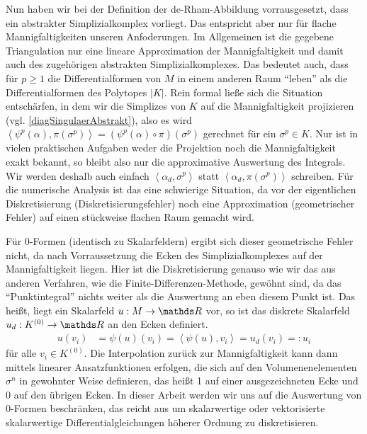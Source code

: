   \begin{bemerkung}
    Nun haben wir bei der Definition der de-Rham-Abbildung vorrausgesetzt, dass ein abstrakter Simplizialkomplex vorliegt.
    Das entspricht aber nur für flache Mannigfaltigkeiten unseren Anfoderungen.
    Im Allgemeinen ist die gegebene Triangulation nur eine lineare Approximation der Mannigfaltigkeit und damit auch des zugehörigen abstrakten Simplizialkomplexes.
    Das bedeutet auch, dass für \( p \ge 1 \) die Differentialformen von \( M \) in einem anderen Raum "`leben"' als die Differentialformen des Polytopes \( |K| \).
    Rein formal ließe sich die Situation entschärfen, in dem wir die Simplizes von \( K \) auf die Mannigfaltigkeit projizieren (vgl. \eqref{diagSingulaerAbstrakt}), also es wird
    \( \left\langle \psi^{p}(\alpha), \pi(\sigma^{p}) \right\rangle = \left( \psi^{p}(\alpha) \circ \pi \right)(\sigma^{p}) \) gerechnet für ein \( \sigma^{p}\in K \).
    Nur ist in vielen praktischen Aufgaben weder die Projektion noch die Mannigfaltigkeit exakt bekannt, so bleibt also nur die approximative Auswertung des Integrals.
    Wir werden deshalb auch einfach  \( \left\langle \alpha_{d}, \sigma^{p} \right\rangle \) statt \( \left\langle \alpha_{d}, \pi(\sigma^{p}) \right\rangle \) schreiben.
    Für die numerische Analysis ist das eine schwierige Situation, da vor der eigentlichen Diskretisierung (Diskretisierungsfehler) noch eine Approximation (geometrischer Fehler) auf einen stückweise
    flachen Raum gemacht wird.

    Für \( 0 \)-Formen (identisch zu Skalarfeldern) ergibt sich dieser geometrische Fehler nicht, da nach Vorraussetzung die Ecken des Simplizialkomplexes auf der Mannigfaltigkeit liegen.
    Hier ist die Diskretisierung genauso wie wir das aus anderen Verfahren, wie die Finite-Differenzen-Methode, gewöhnt sind, da das "`Punktintegral"' nichts weiter als die Auswertung an
    eben diesem Punkt ist.
    Das heißt, liegt ein Skalarfeld \( u:M\rightarrow\R \) vor, so ist das diskrete Skalarfeld \( u_{d}:K^{(0)} \rightarrow \R \) an den Ecken definiert.
    \begin{align}
      u(v_{i}) &=  \psi(u)(v_{i}) = \left\langle \psi(u), v_{i} \right\rangle= u_{d}(v_{i}) =: u_{i} 
    \end{align}
    für alle \( v_{i} \in K^{(0)} \).
    Die Interpolation zurück zur Mannigfaltigkeit kann dann mittels linearer Ansatzfunktionen erfolgen, die sich auf den Volumenenelementen \( \sigma^{n} \) in gewohnter
    Weise definieren, das heißt 1 auf einer ausgezeichneten Ecke und 0 auf den übrigen Ecken.
    In dieser Arbeit werden wir uns auf die Auswertung von \( 0 \)-Formen beschränken, das reicht aus um skalarwertige oder vektorisierte skalarwertige Differentialgleichungen höherer
    Ordnung zu diskretisieren.


\end{bemerkung}
